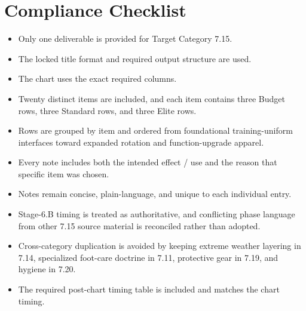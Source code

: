 \documentclass[10pt]{article}
\begin{document}
\begin{landscape}
\endgroup

\end{landscape}

\clearpage

\section*{Compliance Checklist}
{}

\begin{itemize}
\item Only one deliverable is provided for Target Category 7.15.
\item The locked title format and required output structure are used.
\item The chart uses the exact required columns.
\item Twenty distinct items are included, and each item contains three Budget rows, three Standard rows, and three Elite rows.
\item Rows are grouped by item and ordered from foundational training-uniform interfaces toward expanded rotation and function-upgrade apparel.
\item Every note includes both the intended effect / use and the reason that specific item was chosen.
\item Notes remain concise, plain-language, and unique to each individual entry.
\item Stage-6.B timing is treated as authoritative, and conflicting phase language from other 7.15 source material is reconciled rather than adopted.
\item Cross-category duplication is avoided by keeping extreme weather layering in 7.14, specialized foot-care doctrine in 7.11, protective gear in 7.19, and hygiene in 7.20.
\item The required post-chart timing table is included and matches the chart timing.
\end{itemize}
\end{document}
